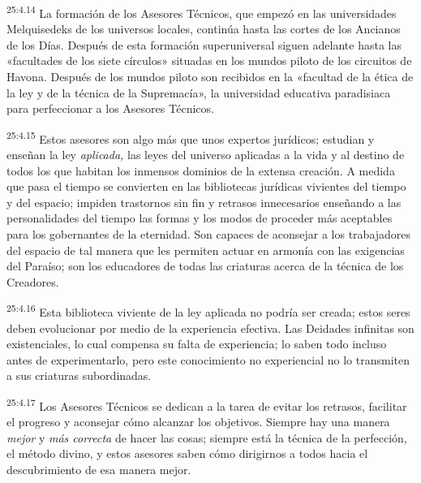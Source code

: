 \par
\textsuperscript{25:4.14} La formación de los Asesores Técnicos, que empezó en las universidades Melquisedeks de los universos locales, continúa hasta las cortes de los Ancianos de los Días. Después de esta formación superuniversal siguen adelante hasta las «facultades de los siete círculos» situadas en los mundos piloto de los circuitos de Havona. Después de los mundos piloto son recibidos en la «facultad de la ética de la ley y de la técnica de la Supremacía», la universidad educativa paradisiaca para perfeccionar a los Asesores Técnicos.

\par
\textsuperscript{25:4.15} Estos asesores son algo más que unos expertos jurídicos; estudian y enseñan la ley \textit{aplicada,} las leyes del universo aplicadas a la vida y al destino de todos los que habitan los inmensos dominios de la extensa creación. A medida que pasa el tiempo se convierten en las bibliotecas jurídicas vivientes del tiempo y del espacio; impiden trastornos sin fin y retrasos innecesarios enseñando a las personalidades del tiempo las formas y los modos de proceder más aceptables para los gobernantes de la eternidad. Son capaces de aconsejar a los trabajadores del espacio de tal manera que les permiten actuar en armonía con las exigencias del Paraíso; son los educadores de todas las criaturas acerca de la técnica de los Creadores.

\par
\textsuperscript{25:4.16} Esta biblioteca viviente de la ley aplicada no podría ser creada; estos seres deben evolucionar por medio de la experiencia efectiva. Las Deidades infinitas son existenciales, lo cual compensa su falta de experiencia; lo saben todo incluso antes de experimentarlo, pero este conocimiento no experiencial no lo transmiten a sus criaturas subordinadas.

\par
\textsuperscript{25:4.17} Los Asesores Técnicos se dedican a la tarea de evitar los retrasos, facilitar el progreso y aconsejar cómo alcanzar los objetivos. Siempre hay una manera \textit{mejor} y \textit{más correcta} de hacer las cosas; siempre está la técnica de la perfección, el método divino, y estos asesores saben cómo dirigirnos a todos hacia el descubrimiento de esa manera mejor.

